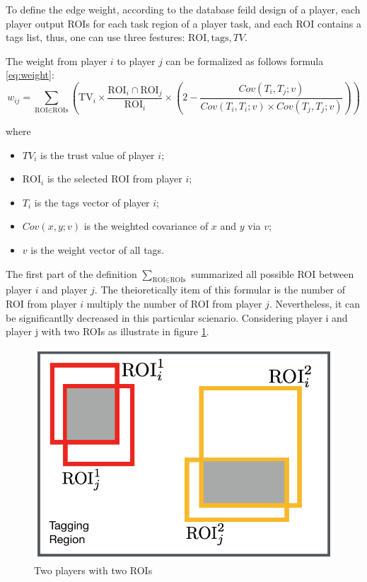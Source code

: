   To define the edge weight, according to the database feild design of a player, each player
  output ROIs for each task region of a player task, and each ROI contains a tags list, thus, 
  one can use three festures: $\text{ROI}, \text{tags}, TV$.

  \begin{definition}
  The weight from player $i$ to player $j$ can be formalized as follows formula \ref{eq:weight}:
  \begin{equation}
  \label{eq:weight}
  w_{ij} = 
  \sum_{\text{ROI}\in\text{ROIs}}{\left(
    \text{TV}_i \times
    \frac{\text{ROI}_i\cap\text{ROI}_j}{\text{ROI}_i}\times
    \left( 2-\frac{Cov(T_i, T_j; v)}
        {Cov(T_i, T_i; v)\times Cov(T_j, T_j; v)} \right)\right)
  }
  \end{equation}

  where 
  
  \begin{itemize}
    \item $TV_i$ is the trust value of player $i$;
    \item $\text{ROI}_i$ is the selected ROI from player $i$;
    \item $T_i$ is the tags vector of player $i$;
    \item $Cov(x, y; v)$ is the weighted covariance of $x$ and $y$ via $v$;
    \item $v$ is the weight vector of all tags.
  \end{itemize}
  \end{definition}

  The first part of the definition $\sum_{\text{ROI}\in\text{ROIs}}$ summarized all possible 
  ROI between player $i$ and player $j$. The theioretically item of this formular is the number
  of ROI from player $i$ multiply the number of ROI from player $j$. Nevertheless, it can be
  significantlly decreased in this particular scienario. Considering player i and player j 
  with two ROIs as illustrate in figure \ref{fig:performance}.

  \begin{figure}[htp]
  \centering
  \includegraphics[width=0.5\columnwidth]{figures/performance}
  \caption{Two players with two ROIs}
  \label{fig:performance}
  \end{figure}

